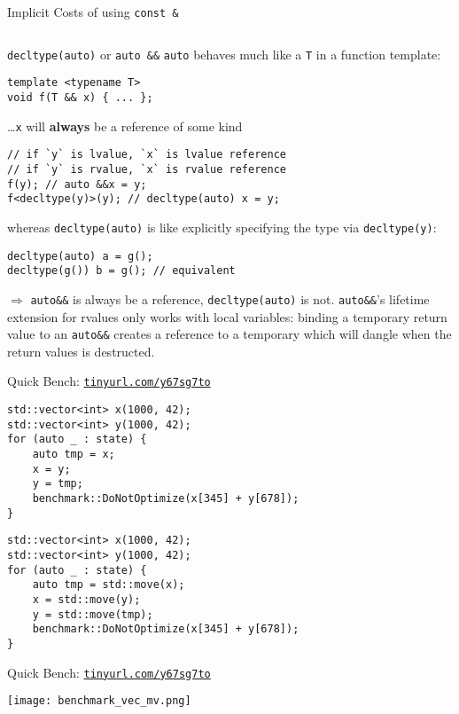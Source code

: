\begin{frame}[fragile]{Implicit Costs of using \texttt{const \&}}
    \begin{columns}[t]
        \begin{column}{.45\textwidth}
        \end{column}
        \begin{column}{.45\textwidth}
        \end{column}
    \end{columns}
\end{frame}

\begin{frame}[fragile]{\texttt{decltype(auto)} or \texttt{auto \&\&}}
    \texttt{auto} behaves much like a \texttt{T} in a function template:
    \begin{lstlisting}
template <typename T>
void f(T && x) { ... };
    \end{lstlisting}
    \ldots \texttt{x} will \textbf{always} be a reference of some kind
    \begin{lstlisting}
// if `y` is lvalue, `x` is lvalue reference
// if `y` is rvalue, `x` is rvalue reference
f(y); // auto &&x = y;
f<decltype(y)>(y); // decltype(auto) x = y;
    \end{lstlisting}
    whereas \texttt{decltype(auto)} is like explicitly specifying the type via \texttt{decltype(y)}:
    \begin{lstlisting}
decltype(auto) a = g();
decltype(g()) b = g(); // equivalent
    \end{lstlisting}

    $\Rightarrow$ \texttt{auto\&\&} is always be a reference, \texttt{decltype(auto)} is not. \texttt{auto\&\&}'s lifetime extension for rvalues only works with local variables: binding a temporary return value to an \texttt{auto\&\&} creates a reference to a temporary which will dangle when the return values is destructed. 
\end{frame}

\begin{frame}[fragile]{Quick Bench: \href{http://quick-bench.com/7qTMMYSgUJG-lRg-B26ZX77vim0}{\texttt{tinyurl.com/y67sg7to}}}
    \begin{lstlisting}
std::vector<int> x(1000, 42);
std::vector<int> y(1000, 42);
for (auto _ : state) {
    auto tmp = x;
    x = y;
    y = tmp;
    benchmark::DoNotOptimize(x[345] + y[678]);
}
    \end{lstlisting}

    \begin{lstlisting}
std::vector<int> x(1000, 42);
std::vector<int> y(1000, 42);
for (auto _ : state) {
    auto tmp = std::move(x);
    x = std::move(y);
    y = std::move(tmp);
    benchmark::DoNotOptimize(x[345] + y[678]);
}
    \end{lstlisting}
\end{frame}

\begin{frame}{Quick Bench: \href{http://quick-bench.com/7qTMMYSgUJG-lRg-B26ZX77vim0}{\texttt{tinyurl.com/y67sg7to}}}
    \centering

    \texttt{[image: benchmark\_vec\_mv.png]}
\end{frame}
